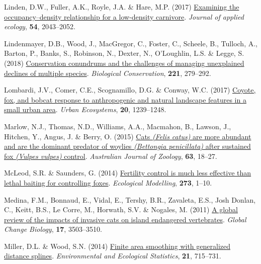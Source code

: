\documentclass[preprint, 3p, authoryear]{elsarticle} %
\newlength{\cslhangindent}
\newlength{\cslentryspacingunit} %
\newenvironment{CSLReferences}[2] %
 {%
  \setlength{\parindent}{0pt}
  \ifodd #1
  \let\oldpar\par
  \def\par{\hangindent=\cslhangindent\oldpar}
  \fi
  \setlength{\parskip}{#2\cslentryspacingunit}
 }%
 {}
\begin{document}
\begin{CSLReferences}{1}{0}
\leavevmode{}%
Linden, D.W., Fuller, A.K., Royle, J.A. \& Hare, M.P. (2017) \href{https://doi.org/10.1111/1365-2664.12883}{Examining the occupancy--density relationship for a low-density carnivore}. \emph{Journal of applied ecology}, \textbf{54}, 2043--2052.

\leavevmode{}%
Lindenmayer, D.B., Wood, J., MacGregor, C., Foster, C., Scheele, B., Tulloch, A., Barton, P., Banks, S., Robinson, N., Dexter, N., O'Loughlin, L.S. \& Legge, S. (2018) \href{https://doi.org/10.1016/j.biocon.2018.03.007}{Conservation conundrums and the challenges of managing unexplained declines of multiple species}. \emph{Biological Conservation}, \textbf{221}, 279--292.

\leavevmode{}%
Lombardi, J.V., Comer, C.E., Scognamillo, D.G. \& Conway, W.C. (2017) \href{https://doi.org/10.1007/s11252-017-0676-z}{Coyote, fox, and bobcat response to anthropogenic and natural landscape features in a small urban area}. \emph{Urban Ecosystems}, \textbf{20}, 1239--1248.

\leavevmode{}%
Marlow, N.J., Thomas, N.D., Williams, A.A., Macmahon, B., Lawson, J., Hitchen, Y., Angus, J. \& Berry, O. (2015) \href{https://doi.org/10.1071/ZO14024}{Cats \emph{({Felis catus})} are more abundant and are the dominant predator of woylies \emph{({Bettongia penicillata})} after sustained fox \emph{({Vulpes vulpes})} control}. \emph{{A}ustralian Journal of Zoology}, \textbf{63}, 18--27.

\leavevmode{}%
McLeod, S.R. \& Saunders, G. (2014) \href{https://doi.org/10.1016/j.ecolmodel.2013.10.016}{Fertility control is much less effective than lethal baiting for controlling foxes}. \emph{Ecological Modelling}, \textbf{273}, 1--10.

\leavevmode{}%
Medina, F.M., Bonnaud, E., Vidal, E., Tershy, B.R., Zavaleta, E.S., Josh Donlan, C., Keitt, B.S., Le Corre, M., Horwath, S.V. \& Nogales, M. (2011) \href{https://doi.org/10.1111/j.1365-2486.2011.02464.x}{A global review of the impacts of invasive cats on island endangered vertebrates}. \emph{Global Change Biology}, \textbf{17}, 3503--3510.

\leavevmode{}%
Miller, D.L. \& Wood, S.N. (2014) \href{https://doi.org/10.1007/s10651-014-0277-4}{Finite area smoothing with generalized distance splines}. \emph{Environmental and Ecological Statistics}, \textbf{21}, 715--731.


\end{CSLReferences}
\end{document}
